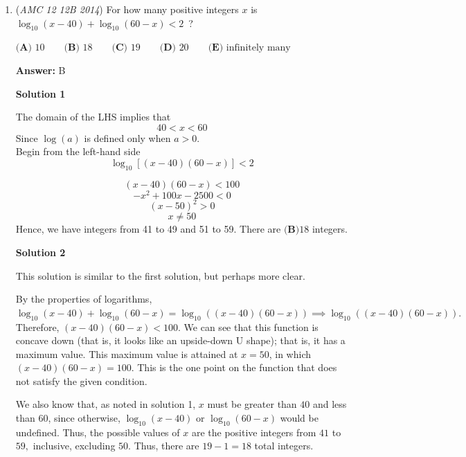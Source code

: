 \begin{enumerate}
 \textbf{Remark} For problems that involve a circle inscribed into an isosceles trapezoid, the following fact is very useful. If we let the bases be $x$ and $y$, and the height be $h$, then $h = \sqrt{xy}$. Then, we could solve from solution 1 directly knowing the radius in terms of the base. By letting the upper base be $1$ and the lower base be $x$, we can find $r$ in terms of $x$, and solve like in solution one.~Puck\_0

 


	\item (\textit{AMC 12 12B 2014}) For how many positive integers $x$ is $\log_{10}(x-40) + \log_{10}(60-x) < 2$ ?


 $\textbf{(A) }10\qquad \textbf{(B) }18\qquad \textbf{(C) }19\qquad \textbf{(D) }20\qquad \textbf{(E) }\text{infinitely many}\qquad$

 \textbf{Answer: }B



\textbf{Solution 1}

The domain of the LHS implies that 
 \[40<x<60\] Since $\log(a)$ is defined only when $a>0$.
 \[\]Begin from the left-hand side
 \[\log_{10}[(x-40)(60-x)]<2\]

 \[(x-40)(60-x)<100\]
 \[-x^2+100x-2500<0\]
 \[(x-50)^2>0\]
 \[x \not = 50\]Hence, we have integers from 41 to 49 and 51 to 59. There are $\boxed{\textbf{(B)} 18}$ integers.

 



\textbf{Solution 2}

This solution is similar to the first solution, but perhaps more clear. 

 By the properties of logarithms, $\log_{10}(x-40)+\log_{10}(60-x)=\log_{10}((x-40)(60-x))\implies\log_{10}((x-40)(60-x)).$ Therefore, $(x-40)(60-x)<100.$ We can see that this function is concave down (that is, it looks like an upside-down U shape); that is, it has a maximum value. This maximum value is attained at $x=50$, in which $(x-40)(60-x)=100.$ This is the one point on the function that does not satisfy the given condition. 

 We also know that, as noted in solution 1, $x$ must be greater than $40$ and less than $60$, since otherwise, $\log_{10}(x-40)$ or $\log_{10}(60-x)$ would be undefined. Thus, the possible values of $x$ are the positive integers from $41$ to $59,$ inclusive, excluding $50.$ Thus, there are $19-1=18$ total integers. 

 



\end{enumerate}
